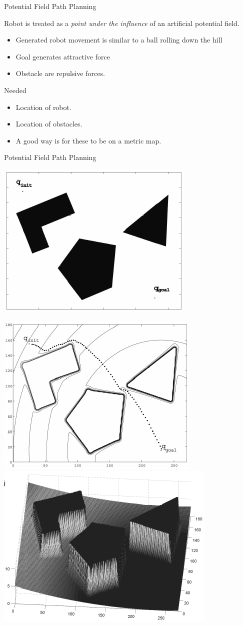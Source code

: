 \documentclass[compress]{beamer}
\begin{document}
\begin{frame}{Potential Field Path Planning}

Robot is treated as a \emph{point under the influence} of an artificial
potential field.

\begin{itemize}
\item Generated robot movement is similar to a ball rolling down the hill
\item Goal generates attractive force
\item Obstacle are repulsive forces.
\end{itemize}

Needed

\begin{itemize}
\item Location of robot.
\item Location of obstacles.
\item A good way is for these to be on a metric map.
\end{itemize}

\end{frame}

\begin{frame}{Potential Field Path Planning}

    \begin{center}
        \includegraphics[width=0.4\linewidth]{potentialfields1}

        \includegraphics[width=0.4\linewidth]{potentialfields2}
        \includegraphics[width=0.4\linewidth]{potentialfields3}
    \end{center}
\end{frame}
\end{document}
